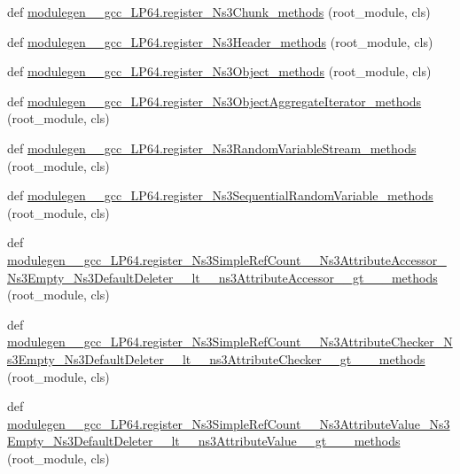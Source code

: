 \begin{DoxyCompactItemize}
\item 
def \hyperlink{namespacemodulegen____gcc__LP64_ad963bb0d3bc0910b7d8b5a1818803799}{modulegen\+\_\+\+\_\+gcc\+\_\+\+L\+P64.\+register\+\_\+\+Ns3\+Chunk\+\_\+methods} (root\+\_\+module, cls)
\item 
def \hyperlink{namespacemodulegen____gcc__LP64_a3c6ef29ba074be124c68037155fe7cbe}{modulegen\+\_\+\+\_\+gcc\+\_\+\+L\+P64.\+register\+\_\+\+Ns3\+Header\+\_\+methods} (root\+\_\+module, cls)
\item 
def \hyperlink{namespacemodulegen____gcc__LP64_a37449428b6bb64d5e534ebe801291a86}{modulegen\+\_\+\+\_\+gcc\+\_\+\+L\+P64.\+register\+\_\+\+Ns3\+Object\+\_\+methods} (root\+\_\+module, cls)
\item 
def \hyperlink{namespacemodulegen____gcc__LP64_ab66e5c7d4bfc0a0524b69d37ef0bbb53}{modulegen\+\_\+\+\_\+gcc\+\_\+\+L\+P64.\+register\+\_\+\+Ns3\+Object\+Aggregate\+Iterator\+\_\+methods} (root\+\_\+module, cls)
\item 
def \hyperlink{namespacemodulegen____gcc__LP64_a8b671930ca330fd0dced5e07fc408a71}{modulegen\+\_\+\+\_\+gcc\+\_\+\+L\+P64.\+register\+\_\+\+Ns3\+Random\+Variable\+Stream\+\_\+methods} (root\+\_\+module, cls)
\item 
def \hyperlink{namespacemodulegen____gcc__LP64_a96820d493e18dbe2fe013127aaf73ae8}{modulegen\+\_\+\+\_\+gcc\+\_\+\+L\+P64.\+register\+\_\+\+Ns3\+Sequential\+Random\+Variable\+\_\+methods} (root\+\_\+module, cls)
\item 
def \hyperlink{namespacemodulegen____gcc__LP64_a9b358364d845a1ffcabb6be20a325b9d}{modulegen\+\_\+\+\_\+gcc\+\_\+\+L\+P64.\+register\+\_\+\+Ns3\+Simple\+Ref\+Count\+\_\+\+\_\+\+Ns3\+Attribute\+Accessor\+\_\+\+Ns3\+Empty\+\_\+\+Ns3\+Default\+Deleter\+\_\+\+\_\+lt\+\_\+\+\_\+ns3\+Attribute\+Accessor\+\_\+\+\_\+gt\+\_\+\+\_\+\+\_\+methods} (root\+\_\+module, cls)
\item 
def \hyperlink{namespacemodulegen____gcc__LP64_acc11c420e32471422fd00230d89398af}{modulegen\+\_\+\+\_\+gcc\+\_\+\+L\+P64.\+register\+\_\+\+Ns3\+Simple\+Ref\+Count\+\_\+\+\_\+\+Ns3\+Attribute\+Checker\+\_\+\+Ns3\+Empty\+\_\+\+Ns3\+Default\+Deleter\+\_\+\+\_\+lt\+\_\+\+\_\+ns3\+Attribute\+Checker\+\_\+\+\_\+gt\+\_\+\+\_\+\+\_\+methods} (root\+\_\+module, cls)
\item 
def \hyperlink{namespacemodulegen____gcc__LP64_abcd5829b1993ba7d28274b9959f71417}{modulegen\+\_\+\+\_\+gcc\+\_\+\+L\+P64.\+register\+\_\+\+Ns3\+Simple\+Ref\+Count\+\_\+\+\_\+\+Ns3\+Attribute\+Value\+\_\+\+Ns3\+Empty\+\_\+\+Ns3\+Default\+Deleter\+\_\+\+\_\+lt\+\_\+\+\_\+ns3\+Attribute\+Value\+\_\+\+\_\+gt\+\_\+\+\_\+\+\_\+methods} (root\+\_\+module, cls)

\end{DoxyCompactItemize}
